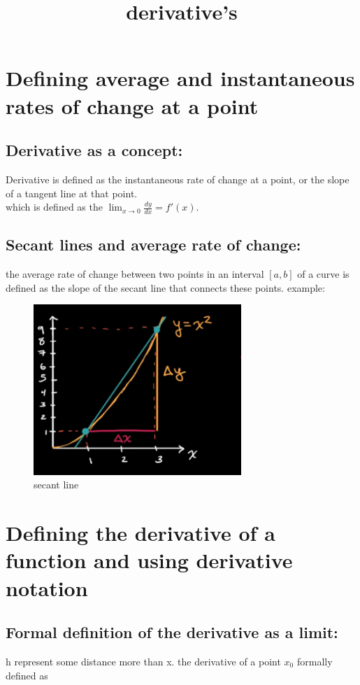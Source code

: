 \documentclass{article}
\title{derivative's}
\begin{document}
\section{Defining average and instantaneous rates of change at a point}
\subsection{Derivative as a concept:}
\noindent
    Derivative is defined as the instantaneous rate of change at a point, 
    or the slope of a tangent line at that point.\\
    which is defined as the \(\lim_{x\to0}\frac{dy}{dx} = f'(x)\).
\subsection{Secant lines and average rate of change:}
    the average rate of change between two points in an interval $[a, b]$ of a curve is defined as the slope of the secant line that connects these points.\newline \newline
    example: \newline \newline

\begin{figure}[ht]
    \centering
    \includegraphics[bb=0 0 360 297, width=0.7\textwidth]{images/secant_line.png}
    \caption{secant line}\label{fig:secant line} 
\end{figure}


\section{Defining the derivative of a function and using derivative notation}
\subsection{Formal definition of the derivative as a limit:}
    h represent some distance more than x. 
    the derivative of a point \(x_0\) formally defined as 
    
\end{document}
